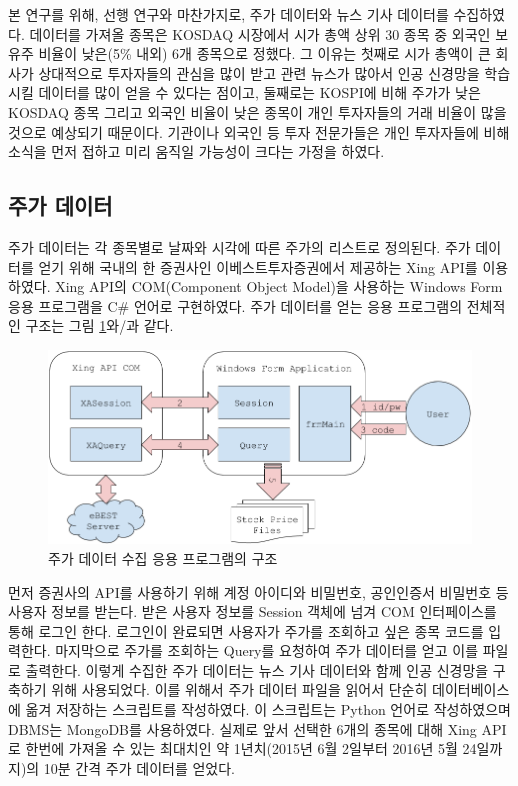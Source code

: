\documentclass[a4paper,10pt]{article}
\begin{document}
본 연구를 위해, 선행 연구와 마찬가지로, 주가 데이터와 뉴스 기사 데이터를 수집하였다.
데이터를 가져올 종목은 KOSDAQ 시장에서 시가 총액 상위 30 종목 중 외국인 보유주 비율이 낮은(5\% 내외) 6개 종목으로 정했다.
그 이유는 첫째로 시가 총액이 큰 회사가 상대적으로 투자자들의 관심을 많이 받고 관련 뉴스가 많아서 인공 신경망을 학습 시킬 데이터를 많이 얻을 수 있다는 점이고,
둘째로는 KOSPI에 비해 주가가 낮은 KOSDAQ 종목 그리고 외국인 비율이 낮은 종목이 개인 투자자들의 거래 비율이 많을 것으로 예상되기 때문이다.
기관이나 외국인 등 투자 전문가들은 개인 투자자들에 비해 소식을 먼저 접하고 미리 움직일 가능성이 크다는 가정을 하였다.

\subsection{주가 데이터}

주가 데이터는 각 종목별로 날짜와 시각에 따른 주가의 리스트로 정의된다.
주가 데이터를 얻기 위해 국내의 한 증권사인 이베스트투자증권에서 제공하는 Xing API를 이용하였다.
Xing API의 COM(Component Object Model)을 사용하는 Windows Form 응용 프로그램을 C\# 언어로 구현하였다.
주가 데이터를 얻는 응용 프로그램의 전체적인 구조는 그림 \ref{fig:getting_price}와/과 같다.
\begin{figure}[h]
\includegraphics[width=\textwidth]{getting_price}
\centering
\caption{주가 데이터 수집 응용 프로그램의 구조}
\label{fig:getting_price}
\end{figure}
먼저 증권사의 API를 사용하기 위해 계정 아이디와 비밀번호, 공인인증서 비밀번호 등 사용자 정보를 받는다.
받은 사용자 정보를 Session 객체에 넘겨 COM 인터페이스를 통해 로그인 한다.
로그인이 완료되면 사용자가 주가를 조회하고 싶은 종목 코드를 입력한다.
마지막으로 주가를 조회하는 Query를 요청하여 주가 데이터를 얻고 이를 파일로 출력한다.
이렇게 수집한 주가 데이터는 뉴스 기사 데이터와 함께 인공 신경망을 구축하기 위해 사용되었다.
이를 위해서 주가 데이터 파일을 읽어서 단순히 데이터베이스에 옮겨 저장하는 스크립트를 작성하였다.
이 스크립트는 Python 언어로 작성하였으며 DBMS는 MongoDB를 사용하였다.
실제로 앞서 선택한 6개의 종목에 대해 Xing API로 한번에 가져올 수 있는 최대치인 약 1년치(2015년 6월 2일부터 2016년 5월 24일까지)의 10분 간격 주가 데이터를 얻었다.
\end{document}

